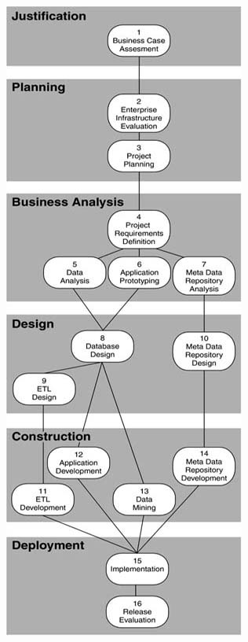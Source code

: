 \begin{minipage}{0.4\textwidth}
    \centering
    \includegraphics[width=\linewidth]{fotos/11.png} 
\end{minipage} \hfill
